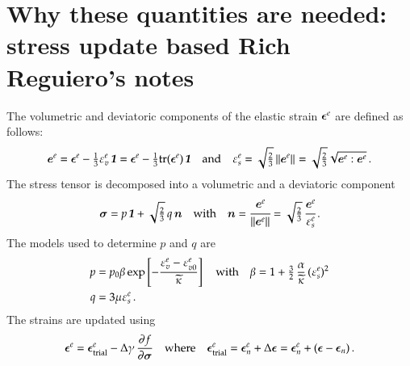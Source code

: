 \documentclass[twoside,10pt,a4paper]{article}
\begin{document}
\section{Why these quantities are needed: stress update based Rich Reguiero's notes}
The volumetric and deviatoric components of the elastic strain $\Beps^e$ are defined
as follows:
\[
   \BeT^e = \Beps^e - \tfrac{1}{3}\Ve^e_v\,\Bone = \Beps^e - \tfrac{1}{3}\Tr(\Beps^e)\,\Bone
   \quad \Tand \quad
   \Ve^e_s = \sqrt{\tfrac{2}{3}}\Norm{\BeT^e}{}  = \sqrt{\tfrac{2}{3}}\sqrt{\BeT^e:\BeT^e} \,.
\]
The stress tensor is decomposed into a volumetric and a deviatoric component
\[
   \Bsig = p\,\Bone + \sqrt{\tfrac{2}{3}}\, q\, \BnT \quad \text{with} \quad
   \BnT = \cfrac{\BeT^e}{\Norm{\BeT^e}{}} = \sqrt{\tfrac{2}{3}}\, \cfrac{\BeT^e}{\Ve^e_s} \,.
\]
The models used to determine $p$ and $q$ are
\[
  \Bal
    p &= p_0\beta\exp\left[-\frac{\Ve^e_v - \Ve^e_{v0}}{\kappatilde}\right] \quad \text{with} \quad
     \beta = 1 + \tfrac{3}{2}\,\frac{\alpha}{\kappatilde}\,(\Ve^e_s)^2 \\
    q &= 3\mu\Ve^e_s \,.
  \Eal
\]
The strains are updated using
\[
  \Beps^e = \Beps^e_{\rm trial} - \Delta\gamma\,\Partial{f}{\Bsig}
  \quad \text{where} \quad \Beps^e_{\rm trial} = \Beps^e_n + \Delta\Beps
     = \Beps^e_n + (\Beps - \Beps_n) \,.
\]
\end{document}
